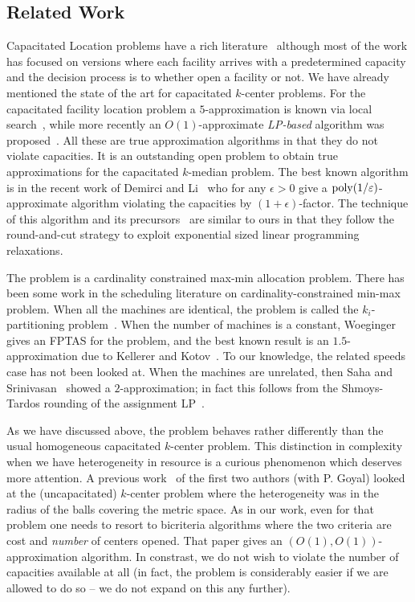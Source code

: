\subsection{Related Work}\label{sec:related}
Capacitated Location problems have a rich literature~\cite{a laundry list} although most of the work has focused on versions where each facility arrives with a predetermined capacity and the decision process is to whether open a facility or not.
We have already mentioned the state of the art for capacitated $k$-center problems.
For the capacitated facility location problem a $5$-approximation is known via local search~\cite{Bansal Garg Gupta ESA 2012}, while more recently an $O(1)$-approximate {\em LP-based} algorithm was proposed~\cite{An Svensson Singh FOCS}.
All these are true approximation algorithms in that they do not violate capacities. It is an outstanding open problem to obtain true approximations for the capacitated $k$-median problem. 
The best known algorithm is in the recent work of  Demirci and Li~\cite{Demirci Li Icalp16} who for any $\epsilon>0$ give a $\mathrm{poly}(1/\varepsilon)$-approximate algorithm violating the capacities by $(1+\epsilon)$-factor.
The technique of this algorithm and its precursors~\cite{An Svnesson Singh focs 14, Li soda 16, Li soda 15}  are similar to ours in that they follow the round-and-cut strategy to exploit exponential sized linear programming relaxations.\smallskip

The \cckp problem is a cardinality constrained max-min allocation problem. There has been some work in the scheduling literature on cardinality-constrained min-max problem.
When all the machines are identical, the problem is called the $k_i$-partitioning problem~\cite{babel kotov kellerer}.
When the number of machines is a constant, Woeginger~\cite{woeginger} gives an FPTAS for the problem, and the best known result is an $1.5$-approximation due to Kellerer and Kotov~\cite{kellerer kotov}.
To our knowledge, the related speeds case has not been looked at. When the machines are unrelated, then Saha and Srinivasan~\cite{Saha Srinivasan ICS 2010} showed a $2$-approximation; in fact this follows from the Shmoys-Tardos rounding of the assignment LP~\cite{Shmoys Tardos}.\smallskip

As we have discussed above, the \mckc problem behaves rather differently than the usual homogeneous capacitated $k$-center problem. This distinction in complexity when we have heterogeneity  in resource is a curious phenomenon which deserves more attention.
A previous work~\cite{our icalp paper} of the first two authors (with P. Goyal) looked at the (uncapacitated) $k$-center problem where the heterogeneity was in the radius of the balls covering the metric space. 
As in our work, even for that problem one needs to resort to bicriteria algorithms where the two criteria are cost and {\em number} of centers opened. That paper gives an $\left(O(1),O(1)\right)$-approximation algorithm.
In constrast, we do not wish to violate the number of capacities available at all (in fact, the problem is considerably easier if we are allowed to do so -- we do not expand on this any further).





